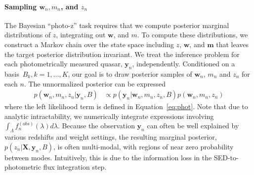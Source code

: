 \documentclass{article} %
\begin{document}


\paragraph{Sampling $\mathbf{w}_n, m_n$, and $z_n$}
The Bayesian ``photo-z'' task requires that we compute posterior marginal distributions of $z$, integrating out $\mathbf{w}$, and $m$.  
To compute these distributions, we construct a Markov chain over the state space including $z$, $\mathbf{w}$, and $\mathbf{m}$ that leaves the target posterior distribution invariant.
We treat the inference problem for each photometrically measured quasar, $\mathbf{y}_n$, independently.
Conditioned on a basis~${B_k, k=1,\dots, K}$, our goal is to draw posterior samples of $\mathbf{w}_n$, $m_n$ and $z_n$ for each $n$.  
The unnormalized posterior can be expressed
\begin{align}
  p(\mathbf{w}_n, m_n, z_n | \mathbf{y}_n, B)
  &\propto p(\mathbf{y}_n | \mathbf{w}_n, m_n, z_n, B) p(\mathbf{w}_n, m_n, z_n) \end{align}
where the left likelihood term is defined in Equation~\ref{eq:phot}. 
Note that due to analytic intractability, we numerically integrate expressions involving $\int_\Lambda f_n^{(obs)}(\lambda) d\lambda$.
Because the observation $\mathbf{y}_n$ can often be well explained by various redshifts and weight settings, the resulting marginal posterior, $p(z_n | \mathbf{X}, \mathbf{y}_n, B)$, is often multi-modal, with regions of near zero probability between modes.
Intuitively, this is due to the information loss in the SED-to-photometric flux integration step.
\end{document}
